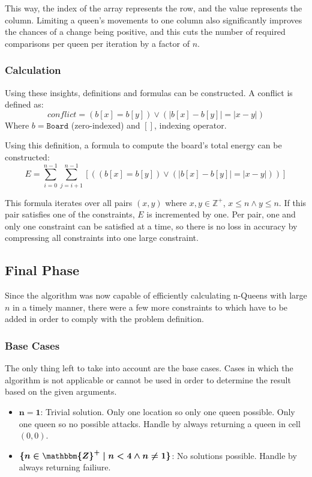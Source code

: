 \documentclass{article}
\begin{document}
This way, the index of the array represents the row, and the value represents the column.
Limiting a queen's movements to one column also significantly improves the chances of a change being positive, and this cuts the number of required comparisons per queen per iteration by a factor of $n$.

\subsubsection{Calculation}
Using these insights, definitions and formulas can be constructed.
A conflict is defined as:
\[
    conflict = (b[x] = b[y]) \lor (|b[x] - b[y]| = |x - y|)
\]
Where $b = \texttt{Board}$ (zero-indexed) and $[ ]$, indexing operator.

Using this definition, a formula to compute the board's total energy can be constructed:
\[
    E = \sum_{i=0}^{n-1} \sum_{j=i+1}^{n-1} \left[ ((b[x] = b[y]) \lor (|b[x] - b[y]| = |x - y|)) \right]
\]

This formula iterates over all pairs $(x, y)$ where $x, y \in \mathbb{Z}^+$, $x \leq n \land y \leq n$.
If this pair satisfies one of the constraints, $E$ is incremented by one.
Per pair, one and only one constraint can be satisfied at a time, so there is no loss in accuracy by compressing all constraints into one large constraint.

\subsection{Final Phase}
Since the algorithm was now capable of efficiently calculating n-Queens with large $n$ in a timely manner,
there were a few more constraints to which have to be added in order to comply with the problem definition.

\subsubsection{Base Cases}
The only thing left to take into account are the base cases.
Cases in which the algorithm is not applicable or cannot be used in order to determine the result based on the given arguments.

\begin{itemize}
    \item $\boldsymbol{n = 1}$: Trivial solution. Only one location so only one queen possible. Only one queen so no possible attacks. Handle by always returning a queen in cell $(0, 0)$.
    \item $\boldsymbol{\{ n \in \mathbbm{Z}^{+} \mid n < 4 \land n \neq 1\}}$: No solutions possible. Handle by always returning failiure.
\end{itemize}
\end{document}
